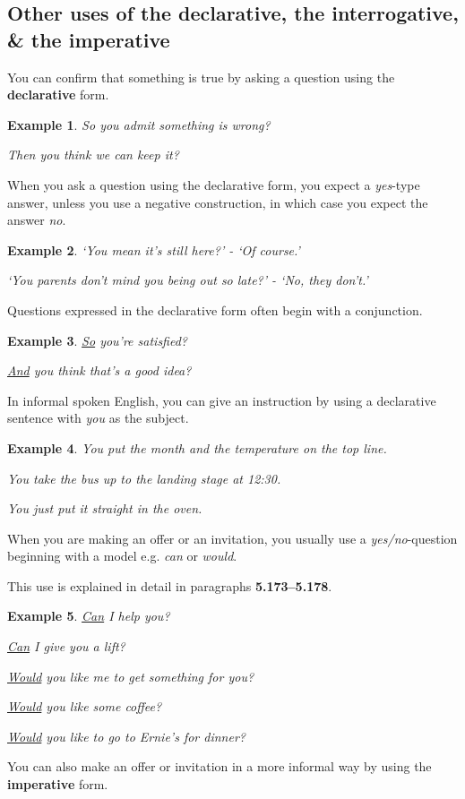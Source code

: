 \documentclass[oneside]{book}
\numberwithin{equation}{section}
\newtheorem{example}{Example}[section]
\begin{document}
\subsection{Other uses of the declarative, the interrogative, \& the imperative}
\noindent{} You can confirm that something is true by asking a question using the \textbf{declarative} form.
\begin{example}
    So you admit something is wrong?
    
    Then you think we can keep it?
\end{example}
When you ask a question using the declarative form, you expect a \textit{yes}-type answer, unless you use a negative construction, in which case you expect the answer \textit{no}.
\begin{example}
    `You mean it's still here?' - `Of course.'
    
    `You parents don't mind you being out so late?' - `No, they don't.'
\end{example}
Questions expressed in the declarative form often begin with a conjunction.
\begin{example}
    \underline{So} you're satisfied?
    
    \underline{And} you think that's a good idea?
\end{example}
%
\noindent{} In informal spoken English, you can give an instruction by using a declarative sentence with \textit{you} as the subject.
\begin{example}
    You put the month and the temperature on the top line.
    
    You take the bus up to the landing stage at 12:30.
    
    You just put it straight in the oven.
\end{example}
%
\noindent{} When you are making an offer or an invitation, you usually use a \textit{yes/no}-question beginning with a model e.g. \textit{can} or \textit{would}.

This use is explained in detail in paragraphs \textbf{5.173--5.178}.
\begin{example}
    \underline{Can} I help you?
    
    \underline{Can} I give you a lift?
    
    \underline{Would} you like me to get something for you?
    
    \underline{Would} you like some coffee?
    
    \underline{Would} you like to go to Ernie's for dinner?
\end{example}
You can also make an offer or invitation in a more informal way by using the \textbf{imperative} form.
\end{document}
